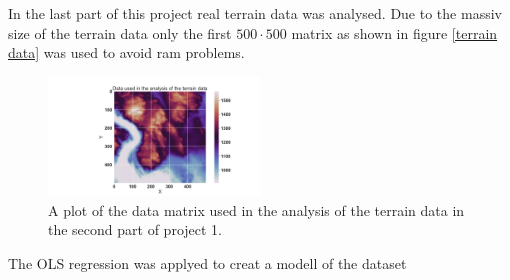 In the last part of this project real terrain data was analysed. Due to the massiv size 
of the terrain data only the first $500 \cdot 500$ matrix as shown in figure \eqref{terrain data} was used to avoid ram problems. 
\begin{figure}[h]
	\centering
	\includegraphics[width=0.5\textwidth]{Figure_11.png}
	\caption{A plot of the data matrix used in the analysis of the terrain data in the second part of project 1.}
	\label{terrain data}
\end{figure}
The OLS regression was applyed to creat a modell of the dataset 
